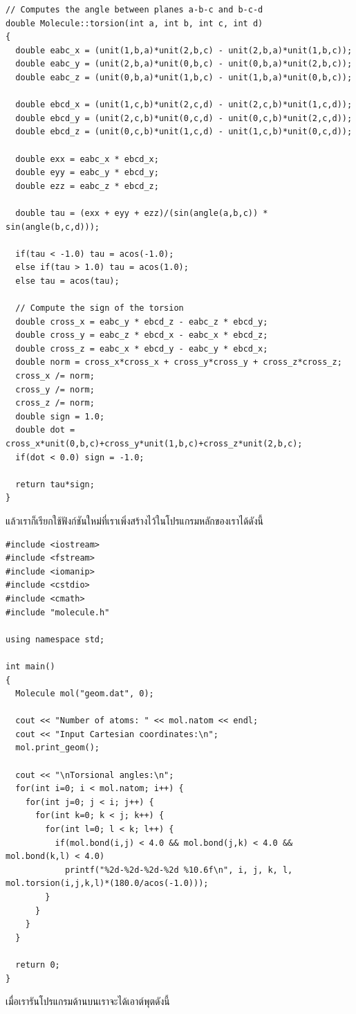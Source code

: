 \begin{lstlisting}[style=MyC++]
// Computes the angle between planes a-b-c and b-c-d
double Molecule::torsion(int a, int b, int c, int d)
{
  double eabc_x = (unit(1,b,a)*unit(2,b,c) - unit(2,b,a)*unit(1,b,c));
  double eabc_y = (unit(2,b,a)*unit(0,b,c) - unit(0,b,a)*unit(2,b,c));
  double eabc_z = (unit(0,b,a)*unit(1,b,c) - unit(1,b,a)*unit(0,b,c));

  double ebcd_x = (unit(1,c,b)*unit(2,c,d) - unit(2,c,b)*unit(1,c,d));
  double ebcd_y = (unit(2,c,b)*unit(0,c,d) - unit(0,c,b)*unit(2,c,d));
  double ebcd_z = (unit(0,c,b)*unit(1,c,d) - unit(1,c,b)*unit(0,c,d));

  double exx = eabc_x * ebcd_x;
  double eyy = eabc_y * ebcd_y;
  double ezz = eabc_z * ebcd_z;

  double tau = (exx + eyy + ezz)/(sin(angle(a,b,c)) * sin(angle(b,c,d)));

  if(tau < -1.0) tau = acos(-1.0);
  else if(tau > 1.0) tau = acos(1.0);
  else tau = acos(tau);

  // Compute the sign of the torsion 
  double cross_x = eabc_y * ebcd_z - eabc_z * ebcd_y;
  double cross_y = eabc_z * ebcd_x - eabc_x * ebcd_z;
  double cross_z = eabc_x * ebcd_y - eabc_y * ebcd_x;
  double norm = cross_x*cross_x + cross_y*cross_y + cross_z*cross_z;
  cross_x /= norm;
  cross_y /= norm;
  cross_z /= norm;
  double sign = 1.0;
  double dot = cross_x*unit(0,b,c)+cross_y*unit(1,b,c)+cross_z*unit(2,b,c);
  if(dot < 0.0) sign = -1.0;

  return tau*sign;
}
\end{lstlisting}

\vspace{5pt}

แล้วเราก็เรียกใช้ฟังก์ชันใหม่ที่เราเพิ่งสร้างไว้ในโปรแกรมหลักของเราได้ดังนี้

\vspace{5pt}

\begin{lstlisting}[style=MyC++]
#include <iostream>
#include <fstream>
#include <iomanip>
#include <cstdio>
#include <cmath>
#include "molecule.h"

using namespace std;

int main()
{
  Molecule mol("geom.dat", 0);

  cout << "Number of atoms: " << mol.natom << endl;
  cout << "Input Cartesian coordinates:\n";
  mol.print_geom();

  cout << "\nTorsional angles:\n";
  for(int i=0; i < mol.natom; i++) {
    for(int j=0; j < i; j++) {
      for(int k=0; k < j; k++) {
        for(int l=0; l < k; l++) {
          if(mol.bond(i,j) < 4.0 && mol.bond(j,k) < 4.0 && mol.bond(k,l) < 4.0)
            printf("%2d-%2d-%2d-%2d %10.6f\n", i, j, k, l, mol.torsion(i,j,k,l)*(180.0/acos(-1.0)));
        }
      }
    }
  }

  return 0;
}
\end{lstlisting}
%
\vspace{5pt}
%
เมื่อเรารันโปรแกรมด้านบนเราจะได้เอาต์พุตดังนี้

